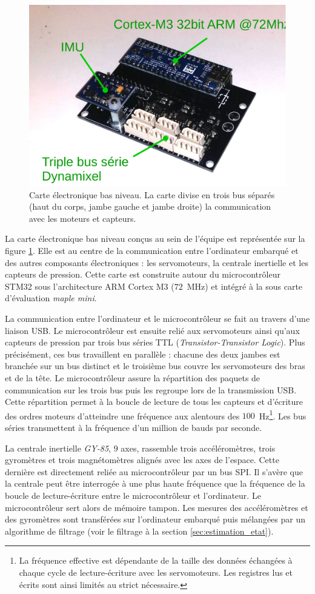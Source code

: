 \begin{figure}[htb]
    \centerfloat
    \includegraphics[type=pdf,ext=.pdf,read=.pdf,width=0.6\linewidth]{../schema/3bus}
    \caption{\label{fig:robot_board} 
        Carte électronique bas niveau.
        La carte divise en trois bus séparés (haut du corps, jambe gauche et jambe droite)
        la communication avec les moteurs et capteurs.
    }
\end{figure}

La carte électronique bas niveau conçus au sein de l'équipe est représentée 
sur la figure \ref{fig:robot_board}.
Elle est au centre de la communication entre l'ordinateur embarqué et des autres composants
électroniques : les servomoteurs, la centrale inertielle et les capteurs de pression.
Cette carte est construite autour du microcontrôleur STM32 sous l'architecture 
ARM Cortex M3 ($72$~MHz) et intégré à la sous carte d'évaluation \textit{maple mini}.

La communication entre l'ordinateur et le microcontrôleur se fait 
au travers d'une liaison USB.
Le microcontrôleur est ensuite relié aux servomoteurs ainsi qu'aux
capteurs de pression par trois bus séries TTL (\textit{Transistor-Transistor Logic}).
Plus précisément, ces bus travaillent en parallèle :
chacune des deux jambes est branchée sur un bus distinct 
et le troisième bus couvre les servomoteurs des bras et de la tête.
Le microcontrôleur assure la répartition des paquets de communication
sur les trois bus puis les regroupe lors de la transmission USB.
Cette répartition permet à la boucle de lecture de tous les capteurs
et d'écriture des ordres moteurs d'atteindre une fréquence aux alentours
des $100$~Hz\footnote{La fréquence
effective est dépendante de la taille des données échangées à chaque cycle de 
lecture-écriture avec les servomoteurs. Les registres lus et écrits sont ainsi
limités au strict nécessaire.}.
Les bus séries transmettent à la fréquence d'un million de bauds par seconde.

La centrale inertielle \textit{GY-85}, $9$ axes, rassemble trois accéléromètres,
trois gyromètres et trois magnétomètres alignés avec les axes de l'espace.
Cette dernière est directement reliée au microcontrôleur par un bus SPI.
Il s'avère que la centrale peut être interrogée à une plus haute fréquence
que la fréquence de la boucle de lecture-écriture entre le microcontrôleur et l'ordinateur.
Le microcontrôleur sert alors de mémoire tampon. Les mesures des accéléromètres et 
des gyromètres sont transférées sur l'ordinateur embarqué puis mélangées par un algorithme de filtrage
(voir le filtrage à la section \ref{sec:estimation_etat}).

